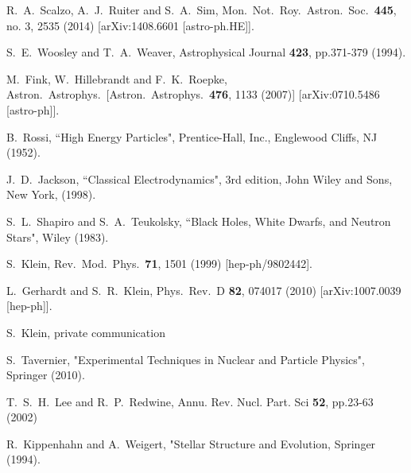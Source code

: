 \documentclass[twocolumn, preprintnumbers,amsmath,amssymb,prd, superscriptaddress]{revtex4}
\begin{document}
\begin{thebibliography}{99}
  R.~A.~Scalzo, A.~J.~Ruiter and S.~A.~Sim,
  Mon.\ Not.\ Roy.\ Astron.\ Soc.\  {\bf 445}, no. 3, 2535 (2014)
  [arXiv:1408.6601 [astro-ph.HE]].


  S.~E.~Woosley and T.~A.~Weaver, Astrophysical Journal {\bf 423}, pp.371-379 (1994).

  M.~Fink, W.~Hillebrandt and F.~K.~Roepke,
  Astron.\ Astrophys.\
  [Astron.\ Astrophys.\  {\bf 476}, 1133 (2007)]
  [arXiv:0710.5486 [astro-ph]].


B.~Rossi, ``High Energy Particles", Prentice-Hall, Inc., Englewood Cliffs, NJ (1952).

J.~D.~Jackson, ``Classical Electrodynamics", 3rd edition, John Wiley and Sons, New
York, (1998).

S.~L.~Shapiro and S.~A.~Teukolsky, ``Black Holes, White Dwarfs, and Neutron Stars", Wiley (1983).

  S.~Klein,
  Rev.\ Mod.\ Phys.\  {\bf 71}, 1501 (1999)
  [hep-ph/9802442].

  L.~Gerhardt and S.~R.~Klein,
  Phys.\ Rev.\ D {\bf 82}, 074017 (2010)
  [arXiv:1007.0039 [hep-ph]].

S.~Klein, private communication

S.~Tavernier, "Experimental Techniques in Nuclear and Particle Physics", Springer (2010).

T.~S.~H.~Lee and R.~P.~Redwine,
 Annu. Rev. Nucl. Part. Sci {\bf 52}, pp.23-63 (2002)

R.~Kippenhahn and A.~Weigert, "Stellar Structure and Evolution, Springer (1994).



\end{thebibliography}
\end{document}
